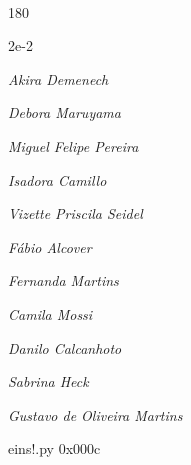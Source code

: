 \documentclass[12pt]{article}
\begin{document}
	\hfill	  	  


\pagebreak			

	\ 
	\vfill
	\begin{turn}{180}	
		\begin{minipage}{\textwidth}
		  	\ttfamily %
			\centering
			{\Huge 2e-2}
		  
			\hfill
		  
			

\textit{\small Akira Demenech}

\textit{\small Debora Maruyama}

\textit{\small Miguel Felipe Pereira}

\textit{\small Isadora Camillo}

\textit{\small Vizette Priscila Seidel}

\textit{\small Fábio Alcover}

\textit{\small Fernanda Martins}

\textit{\small Camila Mossi}

\textit{\small Danilo Calcanhoto}

\textit{\small Sabrina Heck}

\textit{\small Gustavo de Oliveira Martins}

\bigskip

eins!.py
0x000c


		\end{minipage}	
	\end{turn}
	\vfill
	\

\pagebreak
\end{document}
